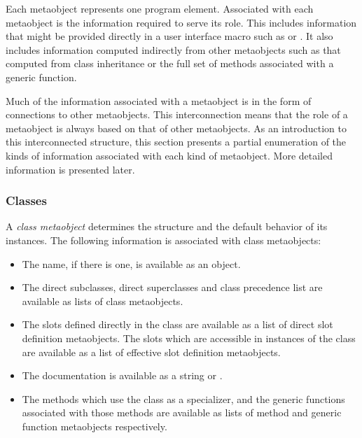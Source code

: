 Each metaobject represents one program element. Associated with each metaobject
is the information required to serve its role. This includes information that
might be provided directly in a user interface macro such as  or
. It also includes information computed indirectly from other
metaobjects such as that computed from class inheritance or the full set of
methods associated with a generic function. 

Much of the information associated with a metaobject is in the form of
connections to other metaobjects. This interconnection means that the role of a
metaobject is always based on that of other metaobjects. As an introduction to
this interconnected structure, this section presents a partial enumeration of
the kinds of information associated with each kind of metaobject. More detailed
information is presented later. 

\subsubsection{Classes}

A \emph{class metaobject} determines the structure and the default behavior of its
instances. The following information is associated with class metaobjects: 


  \begin{itemize}
  \item 
    The name, if there is one, is available as an object.

  \item 
    The direct subclasses, direct superclasses and class precedence list are
    available as lists of class metaobjects. 

  \item 
    The slots defined directly in the class are available as a list of direct
    slot definition metaobjects. The slots which are accessible in instances of
    the class are available as a list of effective slot definition metaobjects.

  \item 
    The documentation is available as a string or .

  \item 
    The methods which use the class as a specializer, and the generic functions
    associated with those methods are available as lists of method and generic
    function metaobjects respectively. 
  \end{itemize}
  


